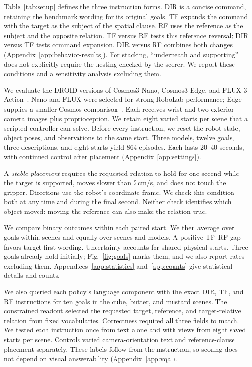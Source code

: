 \documentclass{article}
\begin{document}
Table~\ref{tab:setup} defines the three instruction forms. DIR is a concise command, retaining the benchmark wording for its original goals. TF expands the command with the target as the subject of the spatial clause. RF uses the reference as the subject and the opposite relation. TF versus RF tests this reference reversal; DIR versus TF tests command expansion. DIR versus RF combines both changes (Appendix~\ref{app:behavior-results}). For stacking, ``underneath and supporting'' does not explicitly require the nesting checked by the scorer. We report these conditions and a sensitivity analysis excluding them.

We evaluate the DROID versions of Cosmos3 Nano, Cosmos3 Edge, and FLUX 3 Action~\citep{nvidia2026nano,nvidia2026edge,bfl2026fluxaction}. Nano and FLUX were selected for strong RoboLab performance; Edge supplies a smaller Cosmos comparison~\citep{robolab2026leaderboard}. Each receives wrist and two exterior camera images plus proprioception. We retain eight varied starts per scene that a scripted controller can solve. Before every instruction, we reset the robot state, object poses, and observations to the same start. Three models, twelve goals, three descriptions, and eight starts yield 864 episodes. Each lasts 20--40 seconds, with continued control after placement (Appendix~\ref{app:settings}).

A \emph{stable placement} requires the requested relation to hold for one second while the target is supported, moves slower than 2\,cm/s, and does not touch the gripper. Directions use the robot's coordinate frame. We check this condition both at any time and during the final second. Neither check identifies which object moved: moving the reference can also make the relation true.

We compare binary outcomes within each paired start. We then average over goals within scenes and equally over scenes and models. A positive TF--RF gap favors target-first wording. Uncertainty accounts for shared physical starts. Three goals already hold initially; Fig.~\ref{fig:goals} marks them, and we also report rates excluding them. Appendices~\ref{app:statistics} and~\ref{app:counts} give statistical details and counts.

We also queried each policy's language component with the exact DIR, TF, and RF instructions for ten goals in the cube, butter, and mustard scenes. The constrained readout selected the requested target, reference, and target-relative relation from fixed vocabularies. Correctness required all three fields to match. We tested each instruction once from text alone and with views from eight saved starts per scene. Controls varied camera-orientation text and reference-clause placement separately. These labels follow from the instruction, so scoring does not depend on visual answerability (Appendix~\ref{app:vqa}).
\end{document}
